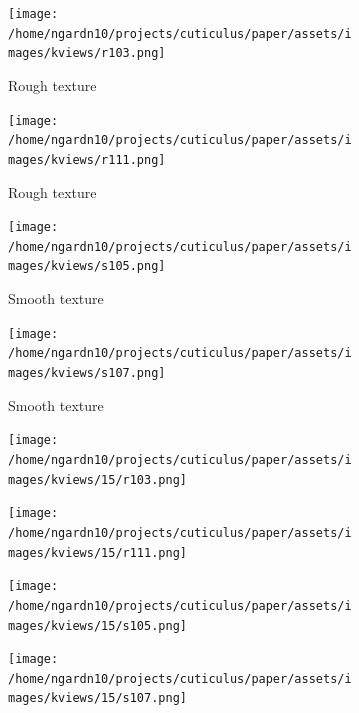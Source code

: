 \documentclass{aci}
\numberwithin{equation}{section}
\begin{document}
\newcommand{\segmentedsubwidth}{0.24\textwidth}
\begin{figure}
    \centering
    \begin{subfigure}{\segmentedsubwidth}
        \texttt{[image: /home/ngardn10/projects/cuticulus/paper/assets/images/kviews/r103.png]}
        \caption*{Rough texture}
    \end{subfigure}
    \begin{subfigure}{\segmentedsubwidth}
        \texttt{[image: /home/ngardn10/projects/cuticulus/paper/assets/images/kviews/r111.png]}
        \caption*{Rough texture}
    \end{subfigure}
    \begin{subfigure}{\segmentedsubwidth}
        \texttt{[image: /home/ngardn10/projects/cuticulus/paper/assets/images/kviews/s105.png]}
        \caption*{Smooth texture}
    \end{subfigure}
    \begin{subfigure}{\segmentedsubwidth}
        \texttt{[image: /home/ngardn10/projects/cuticulus/paper/assets/images/kviews/s107.png]}
        \caption*{Smooth texture}
    \end{subfigure}

    \begin{subfigure}{\segmentedsubwidth}
        \texttt{[image: /home/ngardn10/projects/cuticulus/paper/assets/images/kviews/15/r103.png]}
    \end{subfigure}
    \begin{subfigure}{\segmentedsubwidth}
        \texttt{[image: /home/ngardn10/projects/cuticulus/paper/assets/images/kviews/15/r111.png]}
    \end{subfigure}
    \begin{subfigure}{\segmentedsubwidth}
        \texttt{[image: /home/ngardn10/projects/cuticulus/paper/assets/images/kviews/15/s105.png]}
    \end{subfigure}
    \begin{subfigure}{\segmentedsubwidth}
        \texttt{[image: /home/ngardn10/projects/cuticulus/paper/assets/images/kviews/15/s107.png]}
    \end{subfigure}


\end{figure}
\end{document}
